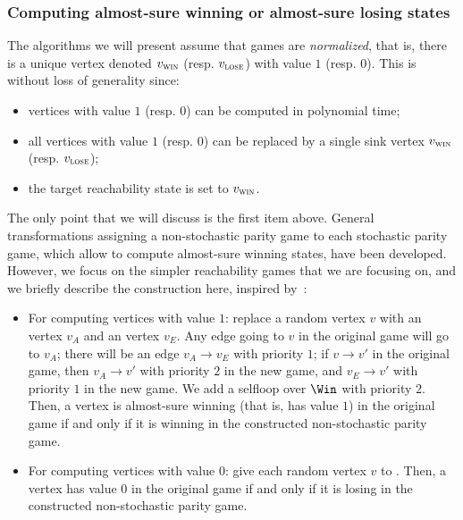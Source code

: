 \subsubsection{Computing almost-sure winning or almost-sure losing
  states}
\label{6-subsubsec:first}

The algorithms we will present assume that games are
\emph{normalized}, that is, there is a unique vertex denoted $v_{\textsc{win}}$
(resp. $v_{\textsc{lose}}$) with value $1$ (resp. $0$).  This is without loss of
generality since:
\begin{itemize}
\item vertices with value $1$ (resp. $0$) can be computed in
  polynomial time;
\item all vertices with value $1$ (resp. $0$) can be replaced by a
  single sink vertex $v_{\textsc{win}}$ (resp. $v_{\textsc{lose}}$);
\item the target reachability state is set to $v_{\textsc{win}}$.
\end{itemize}

The only point that we will discuss is the first item above. General
transformations assigning a non-stochastic parity game to each
stochastic parity game, which allow to compute almost-sure winning
states, have been developed.  However, we focus on the simpler reachability
games that we are focusing on, and we briefly describe the
construction here, inspired by~\cite{paulin-nathalie}:
\begin{itemize}
\item For computing vertices with value $1$: replace a random vertex
  $v$ with an \Adam vertex $v_A$ and an \Eve vertex $v_E$. Any edge
  going to $v$ in the original game will go to $v_A$; there will be an
  edge $v_A \to v_E$ with priority $1$; if $v \to v'$ in the original
  game, then $v_A \to v'$ with priority $2$ in the new game, and $v_E
  \to v'$ with priority $1$ in the new game. We add a selfloop over
  $\Win$ with priority $2$. Then, a vertex is almost-sure winning
  (that is, has value $1$) in the original game if and only if it is
  winning in the constructed non-stochastic parity game.
\item For computing vertices with value $0$: give each random vertex
  $v$ to \Adam. Then, a vertex has value $0$ in the original game if
  and only if it is losing in the constructed non-stochastic parity
  game.
\end{itemize}



